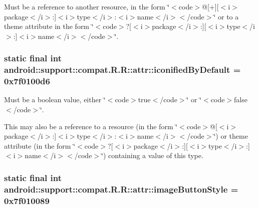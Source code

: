 Must be a reference to another resource, in the form \char`\"{}$<$code$>$@\mbox{[}+\mbox{]}\mbox{[}$<$i$>$package$<$/i$>$:\mbox{]}$<$i$>$type$<$/i$>$:$<$i$>$name$<$/i$>$$<$/code$>$\char`\"{} or to a theme attribute in the form \char`\"{}$<$code$>$?\mbox{[}$<$i$>$package$<$/i$>$:\mbox{]}\mbox{[}$<$i$>$type$<$/i$>$:\mbox{]}$<$i$>$name$<$/i$>$$<$/code$>$\char`\"{}. \hypertarget{classandroid_1_1support_1_1compat_1_1_r_1_1attr_6375bd23df880c7168d138d9419c6ffa}{
\subsubsection[{iconifiedByDefault}]{\setlength{\rightskip}{0pt plus 5cm}static final int android::support::compat.R.R::attr::iconifiedByDefault = 0x7f0100d6}}
\label{classandroid_1_1support_1_1compat_1_1_r_1_1attr_6375bd23df880c7168d138d9419c6ffa}


Must be a boolean value, either \char`\"{}$<$code$>$true$<$/code$>$\char`\"{} or \char`\"{}$<$code$>$false$<$/code$>$\char`\"{}. 

This may also be a reference to a resource (in the form \char`\"{}$<$code$>$@\mbox{[}$<$i$>$package$<$/i$>$:\mbox{]}$<$i$>$type$<$/i$>$:$<$i$>$name$<$/i$>$$<$/code$>$\char`\"{}) or theme attribute (in the form \char`\"{}$<$code$>$?\mbox{[}$<$i$>$package$<$/i$>$:\mbox{]}\mbox{[}$<$i$>$type$<$/i$>$:\mbox{]}$<$i$>$name$<$/i$>$$<$/code$>$\char`\"{}) containing a value of this type. \hypertarget{classandroid_1_1support_1_1compat_1_1_r_1_1attr_91195397fbe349e4a38437836819f41f}{
\subsubsection[{imageButtonStyle}]{\setlength{\rightskip}{0pt plus 5cm}static final int android::support::compat.R.R::attr::imageButtonStyle = 0x7f010089}}
\label{classandroid_1_1support_1_1compat_1_1_r_1_1attr_91195397fbe349e4a38437836819f41f}


